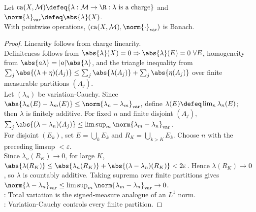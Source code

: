 \begin{theorem} \label{thm:charges-total-variation-banach} \\
Let $\operatorname{ca}(X,\mathcal{M})\defeq\{\lambda:\mathcal{M}\to\R:\lambda\text{ is a charge}\}$ and $\norm{\lambda}_{\mathrm{var}}\defeq\abs{\lambda}(X)$.\\
With pointwise operations, $(\operatorname{ca}(X,\mathcal{M}),\norm{\cdot}_{\mathrm{var}})$ is Banach.
\begin{proof}
Linearity follows from charge linearity.\\
Definiteness follows from $\abs{\lambda}(X)=0\Rightarrow\abs{\lambda}(E)=0\ \forall E$, homogeneity from $\abs{a\lambda}=|a|\abs{\lambda}$, and the triangle inequality from $\sum_j\abs{(\lambda+\eta)(A_j)}\leq\sum_j\abs{\lambda(A_j)}+\sum_j\abs{\eta(A_j)}$ over finite measurable partitions $(A_j)$.\\
Let $(\lambda_n)$ be variation-Cauchy. Since $\abs{\lambda_n(E)-\lambda_m(E)}\leq\norm{\lambda_n-\lambda_m}_{\mathrm{var}}$, define $\lambda(E)\defeq\lim_n\lambda_n(E)$; then $\lambda$ is finitely additive. For fixed $n$ and finite disjoint $(A_j)$, $\sum_j\abs{(\lambda-\lambda_n)(A_j)}\leq\limsup_m\norm{\lambda_m-\lambda_n}_{\mathrm{var}}$.\\
For disjoint $(E_k)$, set $E=\bigcup_kE_k$ and $R_K=\bigcup_{k>K}E_k$. Choose $n$ with the preceding limsup $<\varepsilon$.\\
Since $\lambda_n(R_K)\to0$, for large $K$, $\abs{\lambda(R_K)}\leq\abs{\lambda_n(R_K)}+\abs{(\lambda-\lambda_n)(R_K)}<2\varepsilon$. Hence $\lambda(R_K)\to0$, so $\lambda$ is countably additive. Taking suprema over finite partitions gives $\norm{\lambda-\lambda_n}_{\mathrm{var}}\leq\limsup_m\norm{\lambda_m-\lambda_n}_{\mathrm{var}}\to0$.\\
: Total variation is the signed-measure analogue of an $L^1$ norm.\\
: Variation-Cauchy controls every finite partition.
\end{proof}
\end{theorem}
